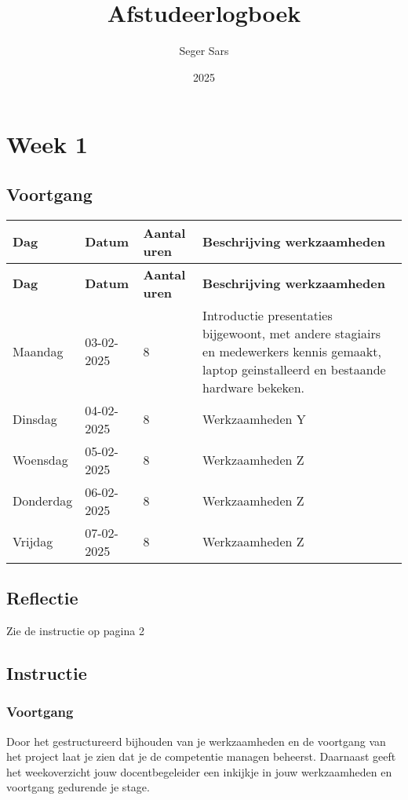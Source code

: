 \documentclass[a4paper,12pt]{article}
\title{Afstudeerlogboek}
\author{Seger Sars}
\date{2025}
\begin{document}
\maketitle

\newpage

\section*{Week 1}

\subsection*{Voortgang}

\begin{longtable}{|l|l|p{}|p{}|}
\hline
\textbf{Dag} & \textbf{Datum} & \textbf{Aantal uren} & \textbf{Beschrijving werkzaamheden} \\
\hline
\endfirsthead
\hline
\textbf{Dag} & \textbf{Datum} & \textbf{Aantal uren} & \textbf{Beschrijving werkzaamheden} \\
\hline
\endhead
\hline
\endfoot
\endlastfoot
Maandag   & 03-02-2025 & 8 & Introductie presentaties bijgewoont, met andere stagiairs en medewerkers kennis gemaakt, laptop geinstalleerd en bestaande hardware bekeken. \\ \hline
Dinsdag   & 04-02-2025 & 8 & Werkzaamheden Y \\ \hline
Woensdag  & 05-02-2025 & 8 & Werkzaamheden Z \\ \hline
Donderdag & 06-02-2025 & 8 & Werkzaamheden Z \\ \hline
Vrijdag   & 07-02-2025 & 8 & Werkzaamheden Z \\ \hline

\hline

\end{longtable}

\subsection*{Reflectie}

Zie de instructie op pagina 2


\newpage

\subsection*{Instructie}

\subsubsection*{Voortgang}
Door het gestructureerd bijhouden van je werkzaamheden en de voortgang van het project laat je zien dat je de competentie managen beheerst. Daarnaast geeft het weekoverzicht jouw docentbegeleider een inkijkje in jouw werkzaamheden en voortgang gedurende je stage.
\end{document}
